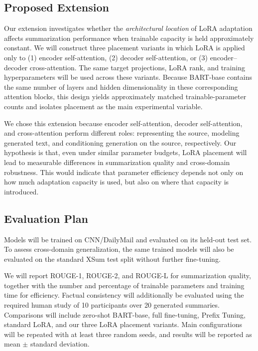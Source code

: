 \documentclass[11pt, letterpaper]{article}
\begin{document}
\subsection{Proposed Extension}

Our extension investigates whether the \emph{architectural location} of LoRA
adaptation affects summarization performance when trainable capacity is held
approximately constant. We will construct three placement variants in which
LoRA is applied only to (1) encoder self-attention, (2) decoder self-attention,
or (3) encoder--decoder cross-attention. The same target projections, LoRA
rank, and training hyperparameters will be used across these variants.
Because BART-base contains the same number of layers and hidden dimensionality
in these corresponding attention blocks, this design yields approximately
matched trainable-parameter counts and isolates placement as the main
experimental variable.

We chose this extension because encoder self-attention, decoder self-attention,
and cross-attention perform different roles: representing the source,
modeling generated text, and conditioning generation on the source,
respectively. Our hypothesis is that, even under similar parameter budgets,
LoRA placement will lead to measurable differences in summarization quality
and cross-domain robustness. This would indicate that parameter efficiency
depends not only on how much adaptation capacity is used, but also on where
that capacity is introduced.

\subsection{Evaluation Plan}

Models will be trained on CNN/DailyMail and evaluated on its held-out test set.
To assess cross-domain generalization, the same trained models will also be
evaluated on the standard XSum test split without further fine-tuning.

We will report ROUGE-1, ROUGE-2, and ROUGE-L for summarization quality,
together with the number and percentage of trainable parameters and training
time for efficiency. Factual consistency will additionally be evaluated using
the required human study of 10 participants over 20 generated summaries.
Comparisons will include zero-shot BART-base, full fine-tuning, Prefix Tuning,
standard LoRA, and our three LoRA placement variants. Main configurations will
be repeated with at least three random seeds, and results will be reported as
mean $\pm$ standard deviation.
\end{document}
